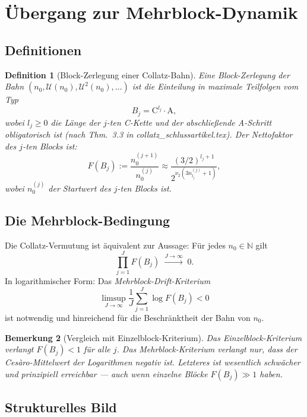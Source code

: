 \documentclass[12pt,a4paper]{article}
\newtheorem{definition}{Definition}[section]
\newtheorem{bemerkung}[definition]{Bemerkung}
\newcommand{\vii}{\nu_2}
\newcommand{\U}{\mathcal{U}}
\newcommand{\N}{\mathbb{N}}
\begin{document}
\section{Übergang zur Mehrblock-Dynamik}
\label{sec:mehrblock}

\subsection{Definitionen}

\begin{definition}[Block-Zerlegung einer Collatz-Bahn]
Eine \emph{Block-Zerlegung} der Bahn $(n_0, \U(n_0), \U^2(n_0), \ldots)$
ist die Einteilung in maximale Teilfolgen vom Typ
\[
  B_j = \mathrm{C}^{l_j}\!\cdot\mathrm{A},
\]
wobei $l_j \geq 0$ die Länge der $j$-ten C-Kette und der abschließende
A-Schritt obligatorisch ist (nach Thm.~3.3 in \textit{collatz\_schlussartikel.tex}).
Der \emph{Nettofaktor} des $j$-ten Blocks ist:
\[
  F(B_j) := \frac{n_0^{(j+1)}}{n_0^{(j)}}
  \approx \frac{(3/2)^{l_j+1}}{2^{\vii(3n_{l_j}^{(j)}+1)}},
\]
wobei $n_0^{(j)}$ der Startwert des $j$-ten Blocks ist.
\end{definition}

\subsection{Die Mehrblock-Bedingung}

\begin{tcolorbox}[kernidee, title={Das richtige Beweisziel}]
Die Collatz-Vermutung ist äquivalent zur Aussage: Für jedes $n_0 \in \N$
gilt
\[
  \prod_{j=1}^{J} F(B_j) \;\xrightarrow{J \to \infty}\; 0.
\]
In logarithmischer Form: Das \emph{Mehrblock-Drift-Kriterium}
\[
  \limsup_{J\to\infty} \frac{1}{J} \sum_{j=1}^{J} \log F(B_j) < 0
\]
ist notwendig und hinreichend für die Beschränktheit der Bahn von $n_0$.
\end{tcolorbox}

\begin{bemerkung}[Vergleich mit Einzelblock-Kriterium]
Das Einzelblock-Kriterium verlangt $F(B_j) < 1$ für alle $j$. Das
Mehrblock-Kriterium verlangt nur, dass der \emph{Cesàro-Mittelwert}
der Logarithmen negativ ist. Letzteres ist wesentlich schwächer und
prinzipiell erreichbar --- auch wenn einzelne Blöcke $F(B_j) \gg 1$ haben.
\end{bemerkung}

\subsection{Strukturelles Bild}
\end{document}

